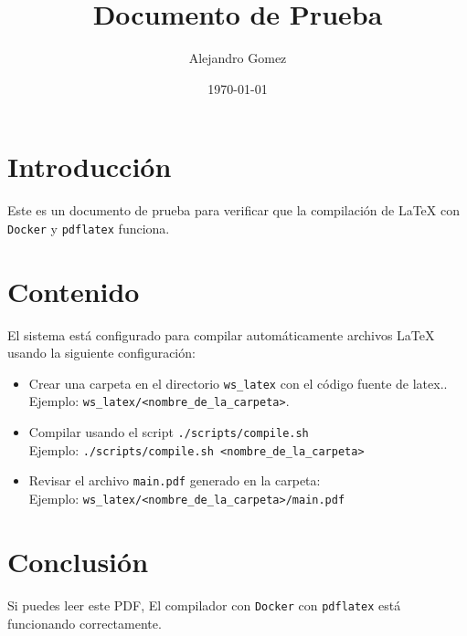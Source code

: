 \documentclass{article}
\title{Documento de Prueba}
\author{Alejandro Gomez}
\date{\today}
\begin{document}
\maketitle

\section{Introducción}

Este es un documento de prueba para verificar que la compilación de LaTeX con \texttt{Docker} y \texttt{pdflatex} funciona.

\section{Contenido}

El sistema está configurado para compilar automáticamente archivos LaTeX usando la siguiente configuración:
\begin{itemize}
    \item Crear una carpeta en el directorio \texttt{ws\_latex} con el código fuente de latex.. \\
    Ejemplo: \texttt{ws\_latex/<nombre\_de\_la\_carpeta>}.
    \item Compilar usando el script \texttt{./scripts/compile.sh} \\
    Ejemplo: \texttt{./scripts/compile.sh <nombre\_de\_la\_carpeta>}
    \item Revisar el archivo \texttt{main.pdf} generado en la carpeta: \\ Ejemplo: \texttt{ws\_latex/<nombre\_de\_la\_carpeta>/main.pdf}
\end{itemize}

\section{Conclusión}

Si puedes leer este PDF, El compilador con \texttt{Docker} con \texttt{pdflatex} está funcionando correctamente.
\end{document}
